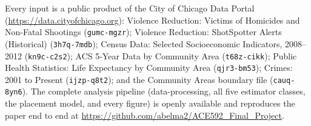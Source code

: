 \documentclass[12pt]{article}
\begin{document}
Every input is a public product of the City of Chicago Data Portal
(\url{https://data.cityofchicago.org}): Violence Reduction: Victims of Homicides and
Non-Fatal Shootings (\texttt{gumc-mgzr}); Violence Reduction: ShotSpotter Alerts
(Historical) (\texttt{3h7q-7mdb}); Census Data: Selected Socioeconomic Indicators,
2008--2012 (\texttt{kn9c-c2s2}); ACS 5-Year Data by Community Area (\texttt{t68z-cikk});
Public Health Statistics: Life Expectancy by Community Area (\texttt{qjr3-bm53});
Crimes: 2001 to Present (\texttt{ijzp-q8t2}); and the Community Areas boundary file
(\texttt{cauq-8yn6}). The complete analysis
pipeline (data-processing, all five estimator classes, the placement model, and every
figure) is openly available and reproduces the paper end to end at
\url{https://github.com/abelma2/ACE592_Final_Project}.

\singlespacing
\end{document}
